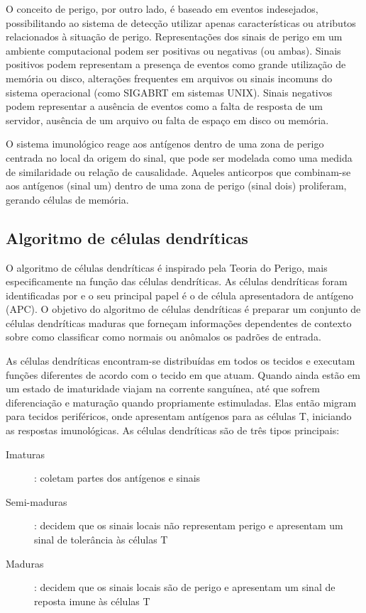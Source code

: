 O conceito de perigo, por outro lado, é baseado em eventos indesejados, possibilitando ao sistema de detecção utilizar apenas características ou atributos relacionados à situação de perigo. Representações dos sinais de perigo em um ambiente computacional podem ser positivas ou negativas (ou ambas). Sinais positivos podem representam a presença de eventos como grande utilização de memória ou disco, alterações frequentes em arquivos ou sinais incomuns do sistema operacional (como SIGABRT em sistemas UNIX). Sinais negativos podem representar a ausência de eventos como a falta de resposta de um servidor, ausência de um arquivo ou falta de espaço em disco ou memória.

O sistema imunológico reage aos antígenos dentro de uma zona de perigo centrada no local da origem do sinal, que pode ser modelada como uma medida de similaridade ou relação de causalidade. Aqueles anticorpos que combinam-se aos antígenos (sinal um) dentro de uma zona de perigo (sinal dois) proliferam, gerando células de memória.

\subsection{Algoritmo de células dendríticas}

O algoritmo de células dendríticas é inspirado pela Teoria do Perigo, mais especificamente na função das células dendríticas. As células dendríticas foram identificadas por \citet{Steinman1973} e o seu principal papel é o de célula apresentadora de antígeno (APC). O objetivo do algoritmo de células dendríticas é preparar um conjunto de células dendríticas maduras que forneçam informações dependentes de contexto sobre como classificar como normais ou anômalos os padrões de entrada.

As células dendríticas encontram-se distribuídas em todos os tecidos e executam funções diferentes de acordo com o tecido em que atuam. Quando ainda estão em um estado de imaturidade viajam na corrente sanguínea, até que sofrem diferenciação e maturação quando propriamente estimuladas. Elas então migram para tecidos periféricos, onde apresentam antígenos para as células T, iniciando as respostas imunológicas. As células dendríticas são de três tipos principais:

\begin{description}
    \item[Imaturas]: coletam partes dos antígenos e sinais
    \item[Semi-maduras]: decidem que os sinais locais não representam perigo e apresentam um sinal de tolerância às células T
    \item[Maduras]: decidem que os sinais locais são de perigo e apresentam um sinal de reposta imune às células T
\end{description}

